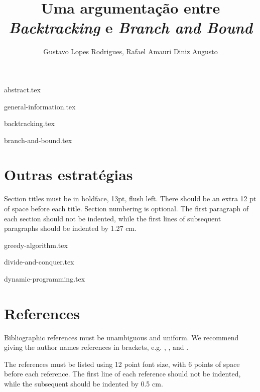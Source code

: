 \documentclass[12pt]{article}
\title{Uma argumentação entre \emph{Backtracking} e \emph{Branch and Bound}}
\author{Gustavo Lopes Rodrigues\inst{1}, Rafael Amauri Diniz Augusto\inst{2}}
\begin{document}
 

  \maketitle

  {abstract.tex}

  {general-information.tex}

  {backtracking.tex}

  {branch-and-bound.tex}

  \section{Outras estratégias} \label{sec:other-strategies}

    Section titles must be in boldface, 13pt, flush left. There should be an extra
    12 pt of space before each title. Section numbering is optional. The first
    paragraph of each section should not be indented, while the first lines of
    subsequent paragraphs should be indented by 1.27 cm.

  {greedy-algorithm.tex}

  {divide-and-conquer.tex}

  {dynamic-programming.tex}

  \section{References}

    Bibliographic references must be unambiguous and uniform.  We recommend giving
    the author names references in brackets, e.g. \cite{knuth:84},
    \cite{boulic:91}, and \cite{smith:99}.

    The references must be listed using 12 point font size, with 6 points of space
    before each reference. The first line of each reference should not be
    indented, while the subsequent should be indented by 0.5 cm.

  
  
\end{document}
